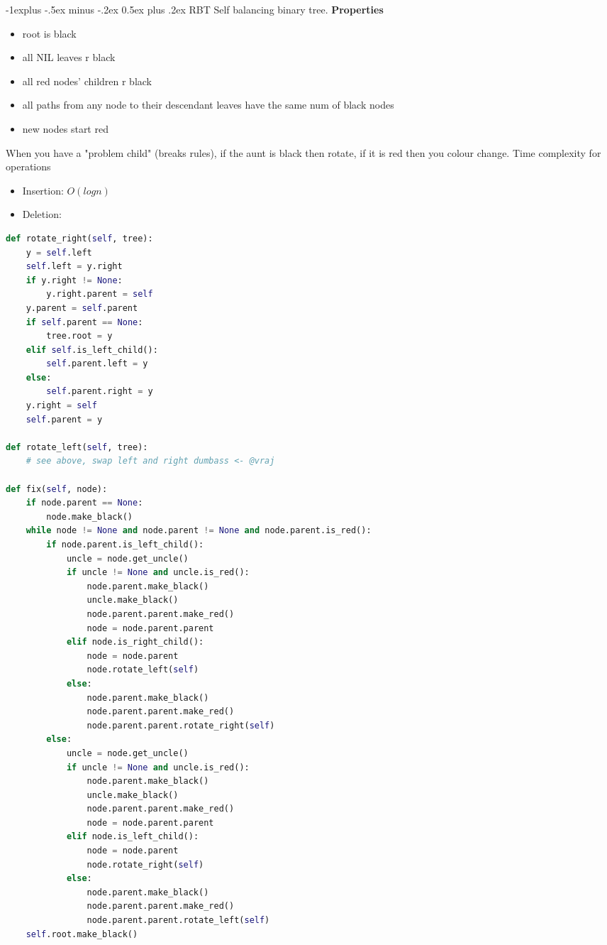\documentclass[letterpaper, 8pt]{extarticle}
\makeatletter
\renewcommand{\subsection}{\@startsection{subsection}{2}{0mm}%
                                {-1explus -.5ex minus -.2ex}%
                                {0.5ex plus .2ex}%
                                {\normalfont\small\bfseries}}
\makeatother
\begin{document}
\begin{multicols*}{5}
\subsection{RBT}
Self balancing binary tree.
\textbf{Properties}
\begin{itemize}
    \item root is black
    \item all NIL leaves r black
    \item all red nodes' children r black
    \item all paths from any node to their descendant leaves have the same num of black nodes
    \item new nodes start red
\end{itemize}
When you have a "problem child" (breaks rules), if the aunt is black then rotate, if it is red then you colour change.
Time complexity for operations
\begin{itemize}
    \item Insertion: $O(log n)$ 
    \item Deletion: %
\end{itemize}
\begin{lstlisting}[language=Python]
def rotate_right(self, tree):
    y = self.left
    self.left = y.right
    if y.right != None:
        y.right.parent = self
    y.parent = self.parent
    if self.parent == None:
        tree.root = y
    elif self.is_left_child():
        self.parent.left = y
    else:
        self.parent.right = y
    y.right = self
    self.parent = y

def rotate_left(self, tree):
    # see above, swap left and right dumbass <- @vraj

def fix(self, node):
    if node.parent == None:
        node.make_black()
    while node != None and node.parent != None and node.parent.is_red():
        if node.parent.is_left_child():
            uncle = node.get_uncle()
            if uncle != None and uncle.is_red():
                node.parent.make_black()
                uncle.make_black()
                node.parent.parent.make_red()
                node = node.parent.parent
            elif node.is_right_child():
                node = node.parent
                node.rotate_left(self)
            else:
                node.parent.make_black()
                node.parent.parent.make_red()
                node.parent.parent.rotate_right(self)
        else:
            uncle = node.get_uncle()
            if uncle != None and uncle.is_red():
                node.parent.make_black()
                uncle.make_black()
                node.parent.parent.make_red()
                node = node.parent.parent
            elif node.is_left_child():
                node = node.parent
                node.rotate_right(self)
            else:
                node.parent.make_black()
                node.parent.parent.make_red()
                node.parent.parent.rotate_left(self)
    self.root.make_black()
\end{lstlisting}


\end{multicols*}
\end{document}
